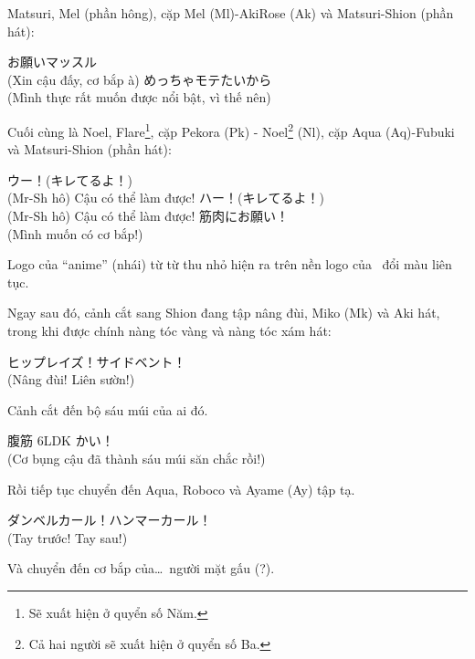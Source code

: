 \documentclass[../main.tex]{subfiles}
\begin{document}
Matsuri, Mel (phần hông), cặp Mel (Ml)-AkiRose (Ak) và Matsuri-Shion (phần hát):

\begin{dialogue}
   お願いマッスル\\(Xin cậu đấy, cơ bắp à)
   めっちゃモテたいから\\(Mình thực rất muốn được nổi bật, vì thế nên)
\end{dialogue}

Cuối cùng là Noel, Flare\footnote{Sẽ xuất hiện ở quyển số Năm.}, cặp Pekora (Pk) - Noel\footnote{Cả hai người sẽ xuất hiện ở quyển số Ba.} (Nl), cặp Aqua (Aq)-Fubuki và Matsuri-Shion (phần hát):

\begin{dialogue}
   ウー！(キレてるよ！)\\(Mr-Sh hô) Cậu có thể làm được!
   ハー！(キレてるよ！)\\(Mr-Sh hô) Cậu có thể làm được!
   筋肉にお願い！\\(Mình muốn có cơ bắp!)
\end{dialogue}

Logo của ``anime'' (nhái) từ từ thu nhỏ hiện ra trên nền logo của \hll\ đổi màu liên tục.


Ngay sau đó, cảnh cắt sang Shion đang tập nâng đùi, Miko (Mk) và Aki hát, trong khi được chính nàng tóc vàng và nàng tóc xám hát:

\begin{dialogue}
   ヒップレイズ！サイドベント！\\(Nâng đùi! Liên sườn!)
\end{dialogue}

Cảnh cắt đến bộ sáu múi của ai đó.

\begin{dialogue}
   腹筋 6LDK かい！\\(Cơ bụng cậu đã thành sáu múi săn chắc rồi!)
\end{dialogue}

Rồi tiếp tục chuyển đến Aqua, Roboco và Ayame (Ay) tập tạ.

\begin{dialogue}
   ダンベルカール！ハンマーカール！\\(Tay trước! Tay sau!)
\end{dialogue}

Và chuyển đến cơ bắp của\dots\ người mặt gấu (?).
\end{document}
